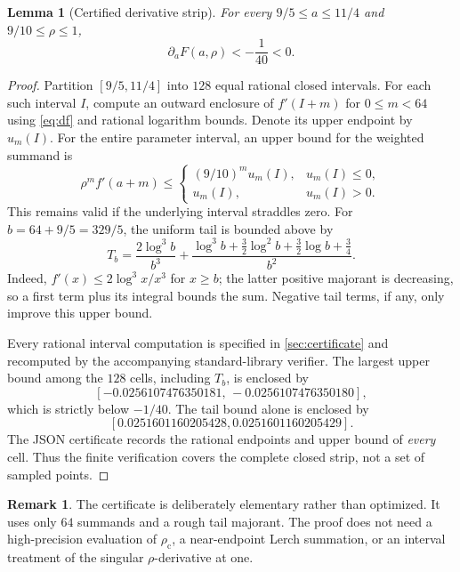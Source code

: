 \documentclass[11pt]{article}
\numberwithin{equation}{section}
\newtheorem{lemma}[lemma]{Lemma}
\theoremstyle{definition}
\newtheorem{remark}[remark]{Remark}
\begin{document}
\begin{lemma}[Certified derivative strip]\label{lem:strip}
For every $9/5\leq a\leq11/4$ and $9/10\leq\rho\leq1$,
\begin{equation}\label{eq:strip}
 \partial_aF(a,\rho)<-\frac1{40}<0.
\end{equation}
\end{lemma}
\begin{proof}
Partition $[9/5,11/4]$ into $128$ equal rational closed intervals.
For each such interval $I$, compute an outward enclosure of
$f'(I+m)$ for $0\leq m<64$ using \eqref{eq:df} and rational logarithm
bounds. Denote its upper endpoint by $u_m(I)$. For the entire parameter
interval, an upper bound for the weighted summand is
\[
 \rho^m f'(a+m)\leq
 \begin{cases}(9/10)^m u_m(I),&u_m(I)\leq0,\\
 u_m(I),&u_m(I)>0.
 \end{cases}
\]
This remains valid if the underlying interval straddles zero.
For $b=64+9/5=329/5$, the uniform tail is bounded above by
\begin{equation}\label{eq:derivtail}
 T_b=\frac{2\log^3b}{b^3}
 +\frac{\log^3b+\frac32\log^2b+\frac32\log b+\frac34}{b^2}.
\end{equation}
Indeed, $f'(x)\leq2\log^3x/x^3$ for $x\geq b$; the latter positive
majorant is decreasing, so a first term plus its integral bounds the
sum. Negative tail terms, if any, only improve this upper bound.

Every rational interval computation is specified in \cref{sec:certificate}
and recomputed by the accompanying standard-library verifier. The largest
upper bound among the $128$ cells, including $T_b$, is enclosed by
\[
 [-0.0256107476350181,\,-0.0256107476350180],
\]
which is strictly below $-1/40$. The tail bound alone is enclosed by
\[ [0.0251601160205428,0.0251601160205429]. \]
The JSON certificate records the rational endpoints and upper bound of
\emph{every} cell. Thus the finite verification covers the complete closed
strip, not a set of sampled points.
\end{proof}

\begin{remark}
The certificate is deliberately elementary rather than optimized. It uses
only $64$ summands and a rough tail majorant. The proof does not need a
high-precision evaluation of $\rho_{\mathrm c}$, a near-endpoint Lerch
summation, or an interval treatment of the singular $\rho$-derivative at one.
\end{remark}
\end{document}
